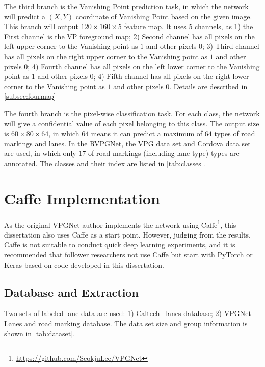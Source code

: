 \begin{spacing}{1.5}
The third branch is the Vanishing Point prediction task, in which the network will predict a $(X, Y)$ coordinate of Vanishing Point based on the given image. This branch will output $120 \times 160 \times 5$ feature map. It uses $5$ channels, as 1) the First channel is the VP foreground map; 2) Second channel has all pixels on the left upper corner to the Vanishing point as $1$ and other pixels $0$; 3) Third channel has all pixels on the right upper corner to the Vanishing point as $1$ and other pixels $0$; 4) Fourth channel has all pixels on the left lower corner to the Vanishing point as $1$ and other pixels $0$; 4) Fifth channel has all pixels on the right lower corner to the Vanishing point as $1$ and other pixels $0$. Details are described in \autoref{subsec:fourmap}

The fourth branch is the pixel-wise classification task. For each class, the network will give a confidential value of each pixel belonging to this class. The output size is $60 \times 80 \times 64$, in which $64$ means it can predict a maximum of $64$ types of road markings and lanes. In the RVPGNet, the VPG data set and Cordova data set are used, in which only $17$ of road markings (including lane type) types are annotated. The classes and their index are listed in \autoref{tab:classes}.

\section{Caffe Implementation}
\label{sec:MD_Caffe}

As the original VPGNet author implements the network using Caffe\footnote{\url{https://github.com/SeokjuLee/VPGNet}}, this dissertation also uses Caffe as a start point. However, judging from the results, Caffe is not suitable to conduct quick deep learning experiments, and it is recommended that follower researchers not use Caffe but start with PyTorch or Keras based on code developed in this dissertation.


\subsection{Database and Extraction}

Two sets of labeled lane data are used: 1) Caltech~\cite{caltech} lanes database; 2) VPGNet~\cite{lee2017vpgnet} Lanes and road marking database. The data set size and group information is shown in \autoref{tab:dataset}. 


\end{spacing}

